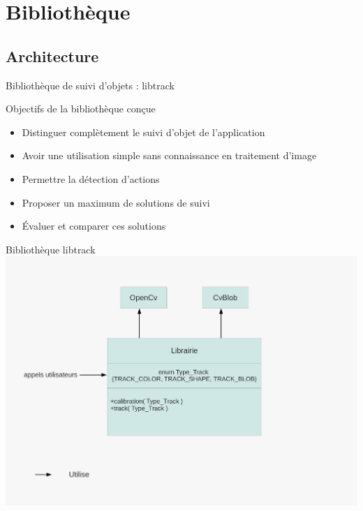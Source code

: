 \documentclass{beamer}
\begin{document}
      \section{Bibliothèque}
            \subsection{Architecture}
            \begin{frame}{Bibliothèque de suivi d'objets : libtrack}
                  \begin{block}{Objectifs de la bibliothèque conçue}
                        \begin{itemize}
                        \item{Distinguer complètement le suivi d'objet de l'application}
                        \item{Avoir une utilisation simple sans connaissance en traitement d'image}
                        \item{Permettre la détection d'actions}
                        \item{Proposer un maximum de solutions de suivi}
                        \item{Évaluer et comparer ces solutions}
                        \end{itemize}
                  \end{block}
            \end{frame}

            \begin{frame}{Bibliothèque libtrack}
                  \includegraphics[scale=0.40]{schema-librairie.pdf}
            \end{frame}
\end{document}
